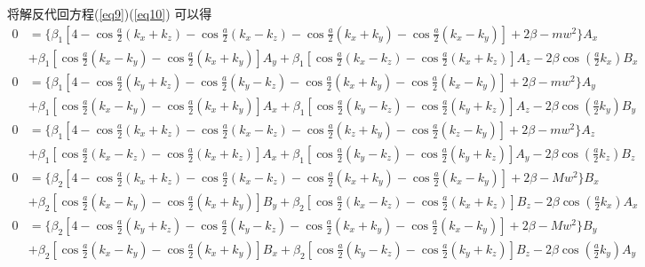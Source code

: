 \documentclass{article}
\begin{document}
将解反代回方程(\ref{eq9})(\ref{eq10}) 可以得
	\begin{equation}
		\begin{aligned}
			0&=\{\beta_1[4-\cos\frac{a}{2}(k_x+k_z)-\cos\frac{a}{2}(k_x-k_z)-\cos\frac{a}{2}(k_x+k_y)-\cos\frac{a}{2}(k_x-k_y)]+2\beta-mw^2\}A_x\\
			&+\beta_1[\cos\frac{a}{2}(k_x-k_y)-\cos\frac{a}{2}(k_x+k_y)]A_y+\beta_1[\cos\frac{a}{2}(k_x-k_z)-\cos\frac{a}{2}(k_x+k_z)]A_z-2\beta\cos(\frac{a}{2}k_x)B_x
		\end{aligned}
	\end{equation}
	\begin{equation}
	\begin{aligned}
		0&=\{\beta_1[4-\cos\frac{a}{2}(k_y+k_z)-\cos\frac{a}{2}(k_y-k_z)-\cos\frac{a}{2}(k_x+k_y)-\cos\frac{a}{2}(k_x-k_y)]+2\beta-mw^2\}A_y\\
		&+\beta_1[\cos\frac{a}{2}(k_x-k_y)-\cos\frac{a}{2}(k_x+k_y)]A_x+\beta_1[\cos\frac{a}{2}(k_y-k_z)-\cos\frac{a}{2}(k_y+k_z)]A_z-2\beta\cos(\frac{a}{2}k_y)B_y
	\end{aligned}
\end{equation}
	\begin{equation}
	\begin{aligned}
		0&=\{\beta_1[4-\cos\frac{a}{2}(k_x+k_z)-\cos\frac{a}{2}(k_x-k_z)-\cos\frac{a}{2}(k_z+k_y)-\cos\frac{a}{2}(k_z-k_y)]+2\beta-mw^2\}A_z\\
		&+\beta_1[\cos\frac{a}{2}(k_x-k_z)-\cos\frac{a}{2}(k_x+k_z)]A_x+\beta_1[\cos\frac{a}{2}(k_y-k_z)-\cos\frac{a}{2}(k_y+k_z)]A_y-2\beta\cos(\frac{a}{2}k_z)B_z
	\end{aligned}
\end{equation}
	\begin{equation}
	\begin{aligned}
		0&=\{\beta_2[4-\cos\frac{a}{2}(k_x+k_z)-\cos\frac{a}{2}(k_x-k_z)-\cos\frac{a}{2}(k_x+k_y)-\cos\frac{a}{2}(k_x-k_y)]+2\beta-Mw^2\}B_x\\
		&+\beta_2[\cos\frac{a}{2}(k_x-k_y)-\cos\frac{a}{2}(k_x+k_y)]B_y+\beta_2[\cos\frac{a}{2}(k_x-k_z)-\cos\frac{a}{2}(k_x+k_z)]B_z-2\beta\cos(\frac{a}{2}k_x)A_x
	\end{aligned}
\end{equation}
	\begin{equation}
	\begin{aligned}
		0&=\{\beta_2[4-\cos\frac{a}{2}(k_y+k_z)-\cos\frac{a}{2}(k_y-k_z)-\cos\frac{a}{2}(k_x+k_y)-\cos\frac{a}{2}(k_x-k_y)]+2\beta-Mw^2\}B_y\\
		&+\beta_2[\cos\frac{a}{2}(k_x-k_y)-\cos\frac{a}{2}(k_x+k_y)]B_x+\beta_2[\cos\frac{a}{2}(k_y-k_z)-\cos\frac{a}{2}(k_y+k_z)]B_z-2\beta\cos(\frac{a}{2}k_y)A_y
	\end{aligned}
\end{equation}
\end{document}
